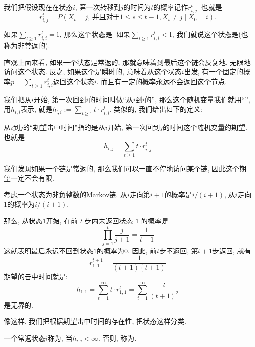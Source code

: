 \begin{definition}
    我们把假设现在在状态$i$, 第一次转移到$j$的时间为$t$的概率记作$r_{i, j}^t$. 也就是
    $$
    r_{i, j}^t=P\left(X_t=j \text{, 并且对于} 1 \leq s \leq t-1, X_s \neq j \mid X_0=i\right).
    $$
\end{definition}

\begin{definition}
    如果$\sum_{t \geq 1} r_{i, i}^t=1$, 那么这个状态是; 如果$\sum_{t \geq 1} r_{i, i}^t<1$, 我们就说这个状态是(也称为非常返的). 
\end{definition}

直观上面来看, 如果一个状态是常返的, 那就意味着到最后这个链会反复地, 无限地访问这个状态. 反之, 如果这个是瞬时的, 意味着从这个状态$i$出发, 有一个固定的概率$p=\sum_{t \geq 1} r_{i, i}^t$返回这个状态$i$. 而且有一定的概率永远不会返回这个节点. 

我们把从$i$开始, 第一次回到$i$的时间叫做``从$i$到$i$的'', 那么这个随机变量我们就用``'', 用$h_{i,i}$表示, 就是$h_{i, i}:=\sum_{t \geq 1} t \cdot r_{i, i}^t$.  类似的, 我们给出如下的定义: 
\begin{definition}
    从$i$到$j$的``期望击中时间''指的是从$i$开始, 第一次回到$j$的时间这个随机变量的期望. 也就是
    $$
    h_{i,j}=\sum_{t \geq 1} t \cdot r_{i, j}^t
    $$
\end{definition}

我们发现如果一个链是常返的, 那么我们可以一直不停地访问某个链, 因此这个期望一定不会有限. 

\begin{example}
    考虑一个状态为非负整数的Markov链. 从$i$走向第$i+1$的概率是$i/(i+1)$, 从$i$走向$1$的概率为$i/(i+1)$. 

    那么, 从状态$1$开始, 在前 $t$ 步内未返回状态 $1$ 的概率是
    $$
    \prod_{j=1}^t \frac{j}{j+1}=\frac{1}{t+1}
    $$
    这就表明最后永远不回到状态$1$的概率为$0$. 因此, 前$t$步不返回, 第$t+1$步返回, 就有
    $$
    r_{1,1}^{t+1}=\frac{1}{(t+1)(t+1)}
    $$
    期望的击中时间就是: 
    $$
    h_{1,1}=\sum_{t=1}^{\infty} t \cdot r_{1,1}^t=\sum_{t=1}^{\infty} \frac{t}{(t+1)^2}
    $$
    是无界的. 
\end{example}

像这样, 我们把根据期望击中时间的存在性, 把状态这样分类. 

\begin{definition}
    一个常返状态$i$称为, 当$h_{i, i}<\infty$. 否则, 称为. 
\end{definition}


